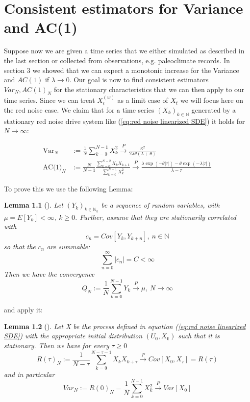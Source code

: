 \documentclass[%
thesis=student,%
coverpage=false,%
titlepage=false,%
headmarks=true, %
english,%
font=libertine, %
math=newpxtx, %
BCOR=5mm,%
coverBCOR=11mm%
]{tumbook}
\newtheorem{lemma}{Lemma}
\begin{document}
\chapter{Consistent estimators for Variance and AC(1)}

Suppose now we are given a time series that we either simulated as described in the last section or collected from observations, e.g. paleoclimate records. In section 3 we showed that we can expect a monotonic increase for the Variance and $AC(1)$ if $\lambda \rightarrow 0$. Our goal is now to find consistent estimators $Var_N, AC(1)_N$ for the stationary characteristics that we can then apply to our time series. Since we can treat $X_{t}^{(w)}$ as a limit case of $X_{t}$ we will focus here on the red noise case. We claim that for a time series $(X_{k})_{k\in\mathbb{N}}$ generated by a stationary red noise drive system like (\ref{eq:red noise linearized SDE}) it holds for $N \rightarrow \infty$:

\begin{subequations}
        \begin{align*}
            \text{Var}_{N} &:= \frac{1}{N}\sum_{k=0}^{N-1}X_{k}^{2} \xrightarrow{P} \frac{\kappa^{2}}{2\lambda\theta(\lambda + \theta)} \\
            \text{AC(1)}_{N} &:= \frac{N}{N-1}\frac{\sum_{k=0}^{N-2}X_{k}X_{k+1}}{\sum_{k=0}^{N-1}X_{k}^{2}} \xrightarrow{P} \frac{\lambda\exp(-\theta\lvert\tau\rvert) - \theta\exp(-\lambda\lvert\tau\rvert)}{\lambda - \tau}
        \end{align*}
\end{subequations}

To prove this we use the following Lemma:

\begin{lemma}[\cite{Morr:2024SM}]
    Let $(Y_{k})_{k\in \mathbb{N}_{0}}$ be a sequence of random variables, with $\mu = E[Y_{k}] < \infty, \ k \geq 0$. Further, assume that they are stationarily correlated with
    \[
    c_{n} = Cov[Y_{k},Y_{k+n}], \ n \in \mathbb{N}
    \]
    so that the $c_{n}$ are summable:
    \[
    \sum_{n=0}^{\infty}\lvert c_{n} \rvert = C < \infty
    \]
    Then we have the convergence
    \[
    Q_{N} := \frac{1}{N}\sum_{k=0}^{N-1}Y_{k} \xrightarrow{P} \mu, \ N \rightarrow \infty
    \]
    \label{lemma:summable covariance}
\end{lemma}

and apply it:

\begin{lemma}[\cite{Morr:2024SM}]
    Let X be the process defined in equation (\ref{eq:red noise linearized SDE}) with the appropriate initial distribution $(U_{0},X_{0})$ such that it is stationary. Then we have for every $\tau \geq 0$
    \[
    R(\tau)_{N} := \frac{1}{N-\tau} \sum_{k=0}^{N-\tau -1} X_{k}X_{k+\tau} \xrightarrow{P} Cov[X_{0},X_{\tau}] = R(\tau)
    \]
    and in particular
    \[
    Var_{N} := R(0)_{N} = \frac{1}{N} \sum_{k=0}^{N-1} X_{k}^{2} \xrightarrow{P}Var[X_{0}]
    \]
    \label{lemma: consistent estimator proof}
\end{lemma}
\end{document}
